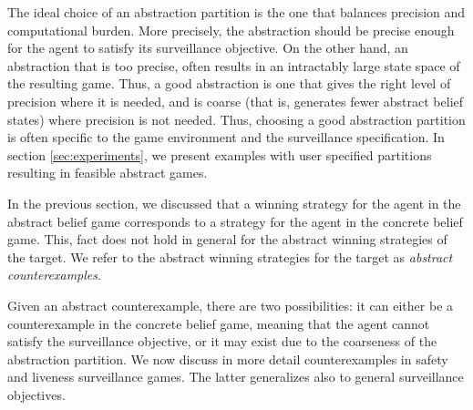 The ideal choice of an abstraction partition is the one that balances precision and computational burden. More precisely, the abstraction should be precise enough for the agent to satisfy its surveillance objective. On the other hand, an abstraction that is too precise, often results in an intractably large state space of the resulting game. Thus, a good abstraction is one that gives the right level of precision where it is needed, and is coarse (that is, generates fewer abstract belief states) where precision is not needed. Thus, choosing a good abstraction partition is often specific to the game environment and the surveillance specification. In section \ref{sec:experiments}, we present  examples with user specified partitions resulting in feasible  abstract games.

In the previous section, we discussed that a winning strategy for the agent in the abstract belief game corresponds to a strategy for the agent in the concrete belief game. This, fact does not hold in general for the abstract winning strategies of the target. We refer to the abstract winning  strategies for the target as \emph{abstract counterexamples}.

Given an abstract counterexample, there are two possibilities: it can either be a counterexample in the concrete belief game, meaning that the agent cannot satisfy the surveillance objective, or it may exist due to the coarseness of the abstraction partition. We now discuss in more detail counterexamples in safety and liveness surveillance games. The latter generalizes also to general surveillance objectives.

